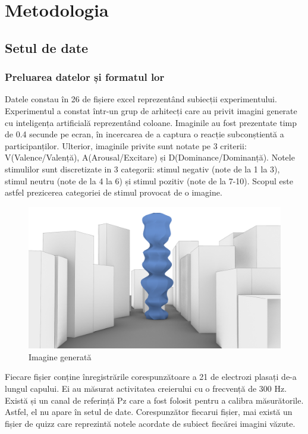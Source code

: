 
\def\totalEpoci{0}
\def\totalEpociTestare{0}
\def\totalEpociValentaPozitiva{0}
\def\totalEpociValentaNegativa{0}
\def\totalEpociValentaNeutra{0}
\def\crestereAcurateteAutoReject{0}
\def\nrParticipantiAntrenare{0}
\def\nrParticipantiValidare{0}
\def\nrParticipantiTestare{0}

\chapter{Metodologia}

\section{Setul de date}
\subsection{Preluarea datelor și formatul lor}
Datele constau în 26 de fișiere excel reprezentând subiecții experimentului.
Experimentul a constat într-un grup de arhitecți care au privit imagini generate cu inteligența artificială reprezentând coloane. Imaginile au fost prezentate timp de 0.4 secunde pe ecran, în incercarea de a captura o reacție subconștientă a participanților.
Ulterior, imaginile  privite sunt notate pe 3 criterii: V(Valence/Valență), A(Arousal/Excitare) și D(Dominance/Dominanță). 
Notele stimulilor sunt discretizate in 3 categorii: stimul negativ (note de la 1 la 3), stimul neutru (note de la 4 la 6) și stimul pozitiv (note de la 7-10). 
Scopul este astfel prezicerea categoriei de stimul provocat de o imagine.

\setlength{\abovecaptionskip}{0pt}
\setlength{\belowcaptionskip}{0pt}
\begin{figure}[h]
    \centering
    \includegraphics[width=0.5\linewidth]{stimul_image.png}
    \caption{Imagine generată}
    \label{fig:enter-label}
\end{figure}

Fiecare fișier conține înregistrările corespunzătoare a 21 de electrozi plasați de-a lungul capului. 
Ei au măsurat activitatea creierului cu o frecvență de 300 Hz. 
Există și un canal de referință Pz care a fost folosit pentru a calibra măsurătorile. 
Astfel, el nu apare în setul de date. 
Corespunzător fiecarui fișier, mai există un fișier de quizz care reprezintă notele acordate de subiect fiecărei imagini văzute. 


